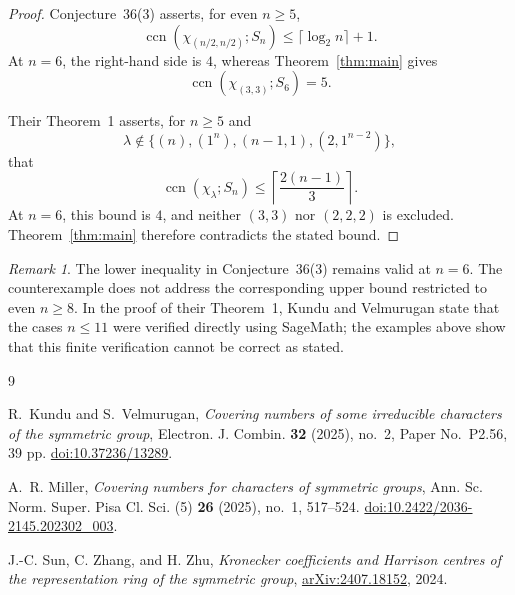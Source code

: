 \documentclass[11pt]{amsart}
\theoremstyle{remark}
\newtheorem{remark}[theorem]{Remark}
\newcommand{\ccn}{\operatorname{ccn}}
\begin{document}
\begin{proof}
Conjecture~36(3) asserts, for even \(n\geq5\),
\[
  \ccn\!\left(\chi_{(n/2,n/2)};S_n\right)
  \leq
  \lceil\log_2 n\rceil+1.
\]
At \(n=6\), the right-hand side is \(4\), whereas
Theorem~\ref{thm:main} gives
\[
  \ccn(\chi_{(3,3)};S_6)=5.
\]

Their Theorem~1 asserts, for \(n\geq5\) and
\[
  \lambda
  \notin
  \{(n),(1^n),(n-1,1),(2,1^{n-2})\},
\]
that
\[
  \ccn(\chi_\lambda;S_n)
  \leq
  \left\lceil\frac{2(n-1)}{3}\right\rceil.
\]
At \(n=6\), this bound is \(4\), and neither \((3,3)\) nor
\((2,2,2)\) is excluded. Theorem~\ref{thm:main} therefore contradicts
the stated bound.
\end{proof}

\begin{remark}
The lower inequality in Conjecture~36(3) remains valid at \(n=6\).
The counterexample does not address the corresponding upper bound
restricted to even \(n\geq8\). In the proof of their Theorem~1, Kundu
and Velmurugan state that the cases \(n\leq11\) were verified directly
using SageMath; the examples above show that this finite verification
cannot be correct as stated.
\end{remark}

\begin{thebibliography}{9}

R.~Kundu and S.~Velmurugan,
\emph{Covering numbers of some irreducible characters of the symmetric
group},
Electron. J. Combin. \textbf{32} (2025), no.~2,
Paper No.~P2.56, 39 pp.
\href{https://doi.org/10.37236/13289}{doi:10.37236/13289}.

A.~R. Miller,
\emph{Covering numbers for characters of symmetric groups},
Ann. Sc. Norm. Super. Pisa Cl. Sci. (5)
\textbf{26} (2025), no.~1, 517--524.
\href{https://doi.org/10.2422/2036-2145.202302_003}
{doi:10.2422/2036-2145.202302\_003}.

J.-C. Sun, C. Zhang, and H. Zhu,
\emph{Kronecker coefficients and Harrison centres of the
representation ring of the symmetric group},
\href{https://arxiv.org/abs/2407.18152}
{arXiv:2407.18152}, 2024.

\end{thebibliography}
\end{document}
